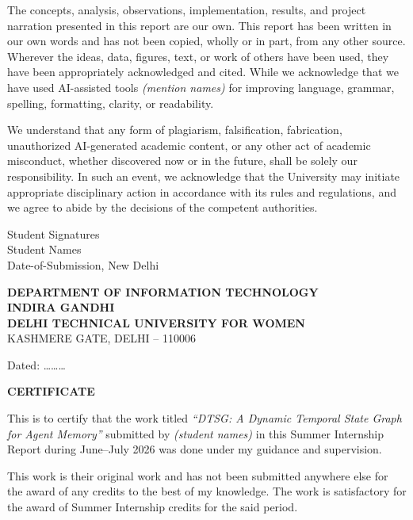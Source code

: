 \documentclass[11pt,a4paper]{article}
\newcommand{\worktitle}{DTSG: A Dynamic Temporal State Graph for Agent Memory}
\begin{document}
\noindent The concepts, analysis, observations, implementation, results, and
project narration presented in this report are our own. This report has been
written in our own words and has not been copied, wholly or in part, from any
other source. Wherever the ideas, data, figures, text, or work of others have
been used, they have been appropriately acknowledged and cited. While we
acknowledge that we have used AI-assisted tools \textit{(mention names)} for
improving language, grammar, spelling, formatting, clarity, or readability. %

\noindent We understand that any form of plagiarism, falsification, fabrication,
unauthorized AI-generated academic content, or any other act of academic
misconduct, whether discovered now or in the future, shall be solely our
responsibility. In such an event, we acknowledge that the University may
initiate appropriate disciplinary action in accordance with its rules and
regulations, and we agree to abide by the decisions of the competent
authorities.

\vspace{2cm}
\noindent Student Signatures\\[1.2cm]
\noindent Student Names\\ %
\noindent Date-of-Submission, New Delhi
\clearpage

\thispagestyle{plain}
\begin{center}
\textbf{DEPARTMENT OF INFORMATION TECHNOLOGY}\\
\textbf{\large INDIRA GANDHI}\\
\textbf{\large DELHI TECHNICAL UNIVERSITY FOR WOMEN}\\
KASHMERE GATE, DELHI -- 110006
\end{center}
\vspace{0.5cm}
\noindent Dated: \dots\dots\dots\ %
\vspace{0.5cm}
\begin{center}\textbf{\large CERTIFICATE}\end{center}

\noindent This is to certify that the work titled \textit{``\worktitle''}
submitted by \textit{(student names)} in this Summer Internship Report during
June--July 2026 was done under my guidance and supervision. %

\noindent This work is their original work and has not been submitted anywhere
else for the award of any credits to the best of my knowledge. The work is
satisfactory for the award of Summer Internship credits for the said period.
\end{document}
